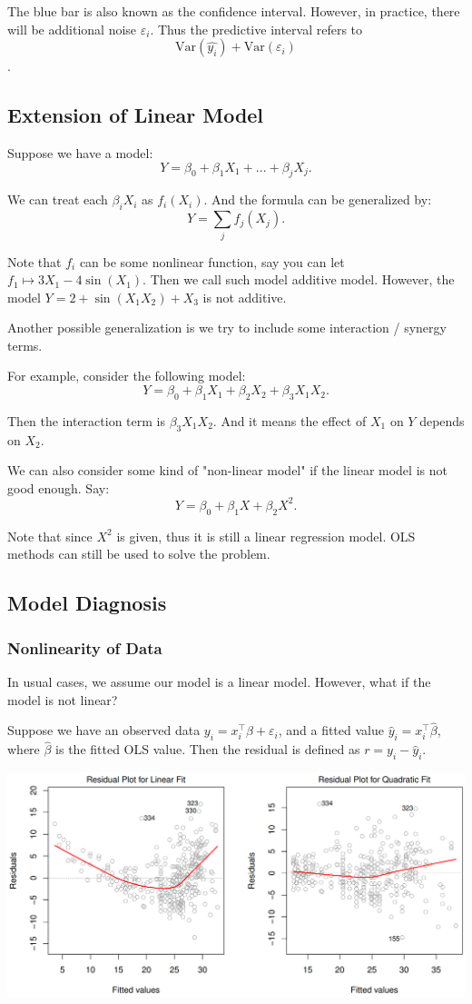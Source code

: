 \documentclass{article}
\theoremstyle{MyNonumberplain}
\theoremstyle{break}
\newcommand{\ve}{\varepsilon}
\newcommand{\var}{\text{Var}}
\newcommand{\T}{^\intercal}
\newcommand{\bt}[1]{\beta_{#1}}
\theoremstyle{break}
\begin{document}
The blue bar is also known as the confidence interval. However, in practice, there will be additional noise $\ve_i$.
Thus the predictive interval refers to $$\var(\hat{y_i})+\var(\ve_i)$$.

\subsection{Extension of Linear Model}

Suppose we have a model:
$$Y=\bt{0}+\bt{1}X_1+...+\bt{j}X_j.$$

We can treat each $\bt{i}X_i$ as $f_i(X_i)$. And the formula can be generalized by:
$$Y=\sum_j f_j(X_j).$$

Note that $f_i$ can be some nonlinear function, say you can let $f_1\mapsto 3X_1-4\sin(X_1)$. Then we call such model additive model. 
However, the model $Y=2+\sin(X_1X_2)+X_3$ is not additive.

Another possible generalization is we try to include some interaction / synergy terms.

For example, consider the following model:
$$Y=\bt{0}+\bt{1}X_1+\bt{2}X_2+\bt{3}X_1X_2.$$

Then the interaction term is $\bt{3}X_1X_2$. And it means the effect of $X_1$ on $Y$ depends on $X_2$.

We can also consider some kind of "non-linear model" if the linear model is not good enough. Say:
$$Y=\bt{0}+\bt{1}X+\bt{2}X^2.$$

Note that since $X^2$ is given, thus it is still a linear regression model. OLS methods can still be used to solve the problem.

\subsection{Model Diagnosis}

\subsubsection{Nonlinearity of Data}

In usual cases, we assume our model is a linear model. However, what if the model is not linear?

Suppose we have an observed data $y_i=x_i\T\beta+\ve_i$, and a fitted value $\hat{y}_i=x_i\T\hat\beta$, where $\hat\beta$ is the fitted OLS value. 
Then the residual is defined as $r=y_i-\hat{y}_i$. 

\includegraphics[scale=0.2]{Images/img10.png}
\end{document}
